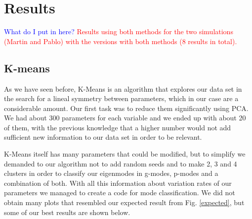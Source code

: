 \documentclass[fleqn,usenatbib]{mnras}
\begin{document}
\section{Results}

\textcolor{blue}{What do I put in here?}
\textcolor{red}{Results using both methods for the two simulations (Martin and Pablo) with the versions with both methods (8 results in total).}
\subsection{K-means}


As we have seen before, K-Means is an algorithm that explores our data set in the search for a lineal symmetry between parameters, which in our case are a considerable amount. Our first task was to reduce them significantly using PCA. We had about 300 parameters for each variable and we ended up with about 20 of them, with the previous knowledge that a higher number would not add sufficient new information to our data set in order to be relevant.

K-Means itself has many parameters that could be modified, but to simplify we demanded to our algorithm not to add random seeds and to make 2, 3 and 4 clusters in order to classify our eigenmodes in g-modes, p-modes and a combination of both. With all this information about variation rates of our parameters we managed to create a code for mode classification. We did not obtain many plots that resembled our expected result  from Fig. \ref{expected}, but some of our best results are shown below.
\end{document}
